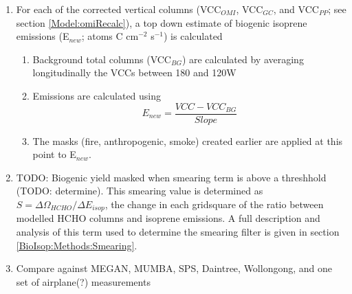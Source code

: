 \begin{enumerate}
      \begin{enumerate}
        \item 
          The fire mask is created daily from non-zero (MODIS) fire counts over the prior 2 days which occur in local or adjacent grid squares at 0.25\degr latitude by 0.3125\degr longitude
        \item 
          A second filter to remove influence from transported smoke plumes is created where OMI AAOD (OMAERUVd) is over 0.03
        \item 
          A filter for anthropogenic influence is created daily using OMNO2d NO$_2$ tropospheric column amounts; masking any grid squares with greater than $1\times 10 ^{15}$ on any particular day, along with grid squares where the yearly average is above $1.5 \times 10^{15}$\moleccm
      \end{enumerate}
      \item For each of the corrected vertical columns (VCC$_{OMI}$, VCC$_{GC}$, and VCC$_{PP}$; see section \ref{Model:omiRecalc}), a top down estimate of biogenic isoprene emissions (E$_{new}$; atoms C cm$^{-2}$ s$^{-1}$) is calculated
      \begin{enumerate}
        \item 
          Background total columns (VCC$_{BG}$) are calculated by averaging longitudinally the VCCs between 180 and 120\degr W
        \item
          Emissions are calculated using 
          \begin{equation} \label{BioIsop:Methods:eqn_Enew}
            E_{new} = \frac{VCC - VCC_{BG}}{Slope}
          \end{equation}
        \item 
          The masks (fire, anthropogenic, smoke) created earlier are applied at this point to E$_{new}$.
      \end{enumerate}
      \item
        TODO: Biogenic yield masked when smearing term is above a threshhold (TODO: determine).
        This smearing value is determined as $S=\Delta \Omega_{HCHO}/ \Delta E_{isop}$, the change in each gridsquare of the ratio between modelled HCHO columns and isoprene emissions. 
        A full description and analysis of this term used to determine the smearing filter is given in section \ref{BioIsop:Methods:Smearing}.
      \item 
        Compare against MEGAN, MUMBA, SPS, Daintree, Wollongong, and one set of airplane(?) measurements
    \end{enumerate}
    
